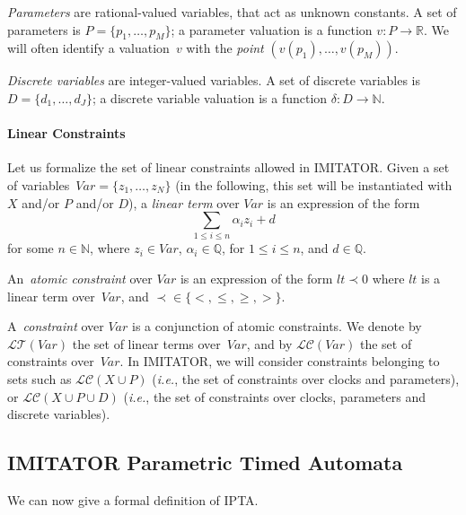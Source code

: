 \documentclass[a4paper,11pt]{report}
\newcommand{\Clock}{X} %
\newcommand{\dval}{\ensuremath{\delta}} %
\newcommand{\DVar}{D} %
\newcommand{\dvar}{d} %
\newcommand{\DVarCard}{J} %
\newcommand{\LConstraint}{\mathcal{LC}} %
\newcommand{\LConstraintXP}{\LConstraint(\Clock \cup \Param)}
\newcommand{\LConstraintXPD}{\LConstraint(\Clock \cup \Param \cup \DVar)}
\newcommand{\lterm}{\mathit{lt}}
\newcommand{\LTerm}{\mathcal{LT}} %
\newcommand{\Param}{P} %
\newcommand{\param}{p} %
\newcommand{\ParamCard}{M} %
\newcommand{\pval}{v} %
\newcommand{\Var}{\mathit{Var}} %
\newcommand{\var}{\mathit{z}} %
\newcommand{\VarCard}{N} %
\newcommand{\grandn}{{\mathbb N}}
\newcommand{\grandq}{{\mathbb Q}}
\newcommand{\grandr}{{\mathbb R}}
\newcommand{\imitator}{\textsf{IMITATOR}}
\newcommand{\IPTA}{IPTA}
\newcommand{\ie}{\textcolor{colorok}{\textit{i.e.}, }}
\begin{document}
\emph{Parameters} are rational-valued variables, that act as unknown constants.
A set of parameters is $\Param = \{ \param_1, \dots, \param_\ParamCard \} $;
a parameter valuation is a function $\pval\colon \Param \rightarrow \grandr$.
We will often identify a valuation~$\pval$ with the \emph{point} $(\pval(\param_1), \dots, \pval(\param_{\ParamCard}))$.

\emph{Discrete variables} are integer-valued variables.
A set of discrete variables is $\DVar = \{ \dvar_1, \dots, \dvar_\DVarCard \} $;
a discrete variable valuation is a function $\dval \colon \DVar \rightarrow \grandn$.


\paragraph{Linear Constraints}
Let us formalize the set of linear constraints allowed in \imitator{}.
Given a set of variables~$\Var = \{ \var_1, \dots, \var_\VarCard \}$ (in the following, this set will be instantiated with $\Clock$ and/or $\Param$ and/or $\DVar$), a \emph{linear term} over $\Var$ is an expression of the form
$$
\sum_{1 \leq i \leq n} \alpha_i \var_i + d
$$
for some $n \in \grandn$,
	where
	$\var_{i} \in \Var$,
	$\alpha_{i} \in \grandq$, for $1 \leq i \leq n$,
	and
	$d \in \grandq$.

An~\emph{atomic constraint} over $\Var$ is an expression of the form
$
\lterm \prec 0
$
	where
	$\lterm$ is a linear term over~$\Var$,
	and
	$\prec \in \{<, \leq, \geq, >\}$.

A~\emph{constraint} over $\Var$ is a conjunction of atomic constraints.
We denote by $\LTerm(\Var)$ the set of linear terms over~$\Var$, and by $\LConstraint(\Var)$ the set of constraints over~$\Var$.
In \imitator{}, we will consider constraints belonging to sets such as $\LConstraintXP$ (\ie{} the set of constraints over clocks and parameters), or $\LConstraintXPD$ (\ie{} the set of constraints over clocks, parameters and discrete variables).


\subsection{\imitator{} Parametric Timed Automata}


We can now give a formal definition of \IPTA{}.
\end{document}
